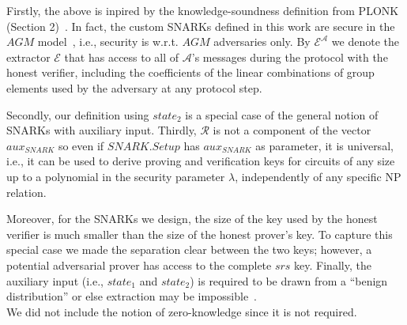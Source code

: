 \vspace{-0.04in}
\noindent Firstly, the above is inpired by the knowledge-soundness definition from PLONK (Section 2)~\cite{plonk}. In fact, the custom SNARKs defined in this work are secure in 
the $\mathit{AGM}$ model~\cite{AGM_model}, i.e., security is w.r.t. $\mathit{AGM}$ adversaries only. By $\mathcal{E}^{\mathcal{A}}$ we denote the extractor $\mathcal{E}$ 
that has access to all of $\mathcal{A}$'s messages during the protocol with the honest verifier, including the coefficients of the linear combinations of 
group elements used by the adversary at any protocol step.

\noindent Secondly, our definition using $\mathit{state_2}$ is a special case of the general notion of SNARKs with auxiliary input. 
Thirdly, $\mathcal{R}$ is not a component of the vector $\mathit{aux_{\mathit{SNARK}}}$ so even if $\mathit{SNARK.Setup}$ has 
$\mathit{aux_{\mathit{SNARK}}}$ as parameter, it is universal, i.e., it can be used to derive proving and verification keys for circuits 
of any size up to a polynomial in the security parameter $\lambda$, independently of any specific NP relation. 

Moreover, for the SNARKs we design, the size of the key used by the honest verifier is much smaller than the size of the honest prover's key. 
To capture this special case we made the separation clear between the two keys; however, a potential adversarial prover has access to the 
complete $\mathit{srs}$ key. Finally, the auxiliary input (i.e., $\mathit{state_1}$ and $\mathit{state_2}$) is required to 
be drawn from a ``benign distribution'' or else extraction may be impossible~\cite{extractability_limits_1,extractability_limits_2}. \\

\noindent We did not include the notion of zero-knowledge since it is not required.
\vspace{-0.1in}